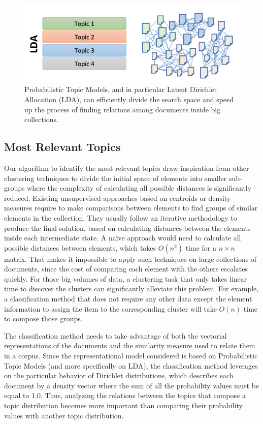 \begin{figure}
  \centering
  \includegraphics[scale=0.37]{lda-cluster.png}
  \caption{Probabilistic Topic Models, and in particular Latent Dirichlet Allocation (LDA), can efficiently divide the search space and speed up the process of finding relations among documents inside big collections.}
  \label{fig:lda-cluster}
\end{figure}



\subsection{Most Relevant Topics}
\label{sec:clustering-approach}

Our algorithm to identify the most relevant topics draw inspiration from other clustering techniques to divide the initial space of elements into smaller sub-groups where the complexity of calculating all possible distances is significantly reduced. Existing unsupervised approaches based on centroids or density measures require to make comparisons between elements to find groups of similar elements in the collection. They usually follow an iterative methodology to produce the final solution, based on calculating distances between the elements inside each intermediate state. A na{\"i}ve approach would need to calculate all possible distances between elements, which takes $O(n^2)$ time for a $n \times n$ matrix. That makes it impossible to apply such techniques on large collections of documents, since the cost of comparing each element with the others escalates quickly. For those big volumes of data, a clustering task that only takes linear time to discover the clusters can significantly alleviate this problem. For example, a classification method that does not require any other data except the element information to assign the item to the corresponding cluster will take $O(n)$ time to compose those groups.

The classification method needs to take advantage of both the vectorial representations of the documents and the similarity measure used to relate them in a corpus. Since the representational model considered is based on Probabilistic Topic Models (and more specifically on LDA), the classification method leverages on the particular behavior of Dirichlet distributions, which describes each document by a density vector where the sum of all the probability values must be equal to 1.0. Thus, analyzing the relations between the topics that compose a topic distribution becomes more important than comparing their probability values with another topic distribution.


